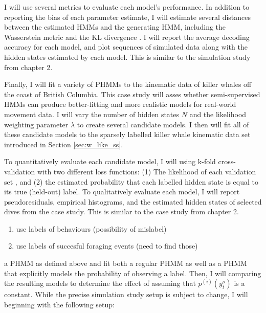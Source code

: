 I will use several metrics to evaluate each model's performance. In addition to reporting the bias of each parameter estimate, I will estimate several distances between the estimated HMMs and the generating HMM, including the Wasserstein metric \citep{Chen:2020} and the KL divergence \citep{Kullback:1951}. I will report the average decoding accuracy for each model, and plot sequences of simulated data along with the hidden states estimated by each model. This is similar to the simulation study from chapter 2.


Finally, I will fit a variety of PHMMs to the kinematic data of killer whales off the coast of British Columbia. This case study will asses whether semi-supervised HMMs can produce better-fitting and more realistic models for real-world movement data. I will vary the number of hidden states $N$ and the likelihood weighting parameter $\lambda$ to create several candidate models. I then will fit all of these candidate models to the sparsely labelled killer whale kinematic data set introduced in Section \ref{sec:w_like_ss}. 

To quantitatively evaluate each candidate model, I will using k-fold cross-validation with two different loss functions: (1) The likelihood of each validation set \citep{Celeux:2008}, and (2) the estimated probability that each labelled hidden state is equal to its true (held-out) label. To qualitatively evaluate each model, I will report pseudoresiduals, empirical histograms, and the estimated hidden states of selected dives from the case study. This is similar to the case study from chapter 2. %

\begin{enumerate}
    \item use labels of behaviours (possibility of mislabel)
    \item use labels of succesful foraging events (need to find those)
\end{enumerate}


\iffalse
a PHMM as defined above and fit both a regular PHMM as well as a PHMM that explicitly models the probability of observing a label. Then, I will comparing the resulting models to determine the effect of assuming that $p^{(i)}(y^o_t)$ is a constant. While the precise simulation study setup is subject to change, I will beginning with the following setup:

